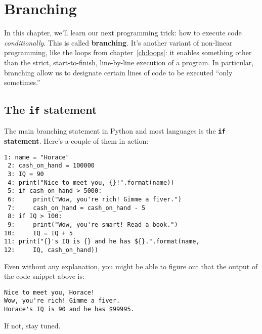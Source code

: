 
\chapter{Branching}
\label{ch:branching}


In this chapter, we'll learn our next programming trick: how to execute code
\textit{conditionally}. This is called \textbf{branching}. It's another variant
of non-linear programming, like the loops from chapter~\ref{ch:loops}: it
enables something other than the strict, start-to-finish, line-by-line
execution of a program. In particular, branching allow us to designate certain
lines of code to be executed ``only sometimes.''

\section{The \texttt{if} statement}


The main branching statement in Python and most languages is the
\textbf{\texttt{if} statement}. Here's a couple of them in action:


\begin{Verbatim}[fontsize=\small,samepage=true,frame=single,framesep=3mm]
 1: name = "Horace"
 2: cash_on_hand = 100000
 3: IQ = 90
 4: print("Nice to meet you, {}!".format(name))
 5: if cash_on_hand > 5000:
 6:     print("Wow, you're rich! Gimme a fiver.")
 7:     cash_on_hand = cash_on_hand - 5
 8: if IQ > 100:
 9:     print("Wow, you're smart! Read a book.")
10:     IQ = IQ + 5
11: print("{}'s IQ is {} and he has ${}.".format(name,
12:     IQ, cash_on_hand))
\end{Verbatim}
\vspace{-.2in}

Even without any explanation, you might be able to figure out that the output
of the code snippet above is:

\begin{Verbatim}[fontsize=\small,samepage=true,frame=leftline,framesep=5mm,framerule=1mm]
Nice to meet you, Horace!
Wow, you're rich! Gimme a fiver.
Horace's IQ is 90 and he has $99995.
\end{Verbatim}

If not, stay tuned.

\label{ifBody}

